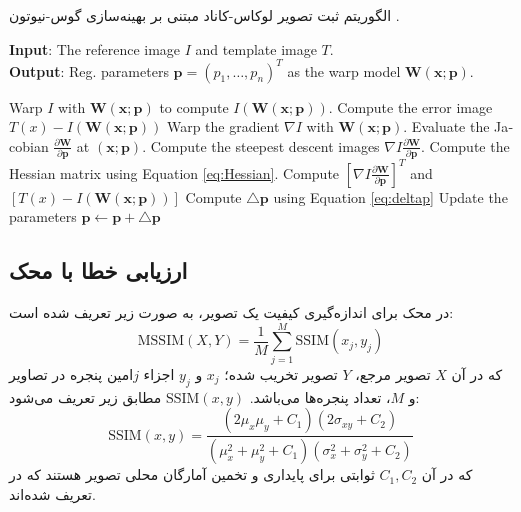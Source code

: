\documentclass[conference]{IEEEtran-ModifiedForMVIP}
\newcommand{\warp}{\mathbf{W}(\mathbf{x};\mathbf{p})}
\newcommand{\IWarp}{I(\mathbf{W}(\mathbf{x};\mathbf{p}))}
\newcommand{\roundB}[2]{\frac{\partial{\mathbf{#1}}}{\partial{\mathbf{#2}}}}
\begin{document}
\begin{algorithm}[t]
\caption{الگوریتم ثبت تصویر لوکاس-کاناد مبتنی بر بهینه‌سازی گوس-نیوتون .} \label{alg1}
\singlespacing
\begin{latin}
\textbf{Input}:
The reference image $I$ and template image $T$.\\
\textbf{Output}: Reg. parameters
$\mathbf{p}=(p_1,\dots,p_n)^T$ as the warp model $\warp$.
\begin{algorithmic}[1]
\REPEAT
  \STATE Warp $I$ with $\warp$ to compute $\IWarp$. 
  \STATE Compute the error image $T(x)-\IWarp$ 
  \STATE Warp the gradient $\nabla I$ with $\warp$. \STATE Evaluate the Jacobian
    $\roundB{W}{p}$ at $(\mathbf{x;p})$. 
  \STATE Compute the steepest descent images $\nabla I\roundB{W}{p}$. 
  \STATE \label{line:Hessian} Compute the Hessian matrix using Equation
    \eqref{eq:Hessian}. 
  \STATE Compute $[\nabla I\roundB{W}{p}]^T$ and $[T(x)-\IWarp]$ 
  \STATE \label{alg1:deltap} Compute $\triangle\mathbf{p}$ using Equation \eqref{eq:deltap} 
  \STATE Update the parameters $\mathbf{p}\leftarrow\mathbf{p}+\triangle\mathbf{p}$ 
\end{algorithmic}
\end{latin}
\end{algorithm}


\subsection{ارزیابی خطا با محک }
در \cite{Wang04image} محک  برای اندازه‌گیری کیفیت یک تصویر، به صورت زیر تعریف شده است:
\begin{equation}\label{eq:MSSIM}
    \textrm{MSSIM}(X,Y) = \frac{1}{M}\sum_{j=1}^M \textrm{SSIM}(x_j,y_j)
\end{equation}
که در آن $X$ تصویر مرجع، $Y$ تصویر تخریب شده؛ $x_j$ و $y_j$ اجزاء $j$امین پنجره در تصاویر و $M$، تعداد پنجره‌ها می‌باشد. 
$\textrm{SSIM}(x,y)$ مطابق زیر تعریف می‏‌شود:
\begin{equation}\label{eq:SSIM}
    \textrm{SSIM}(x,y)=\frac{(2\mu_x\mu_y+C_1)(2\sigma_{xy}+C_2)}{(\mu_x^2+\mu_y^2+C_1)(\sigma_x^2+\sigma_y^2+C_2)}
\end{equation}
که در آن $C_1,C_2$ ثوابتی برای پایداری و  تخمین آمارگان محلی تصویر هستند که در \cite{Wang04image} تعریف شده‌اند. 
\end{document}
